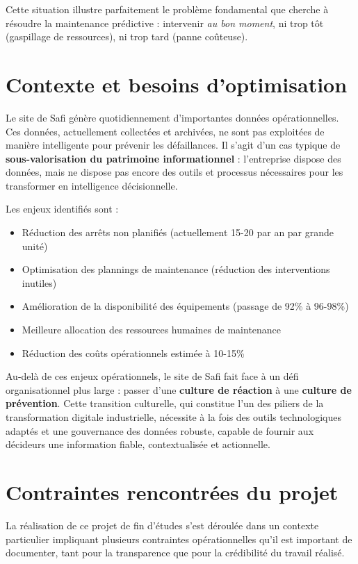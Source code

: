 \documentclass[a4paper,12pt]{report}
\begin{document}
Cette situation illustre parfaitement le problème fondamental que cherche à résoudre la maintenance prédictive : intervenir \textit{au bon moment}, ni trop tôt (gaspillage de ressources), ni trop tard (panne coûteuse).

\section{Contexte et besoins d'optimisation}

Le site de Safi génère quotidiennement d'importantes données opérationnelles. Ces données, actuellement collectées et archivées, ne sont pas exploitées de manière intelligente pour prévenir les défaillances. Il s'agit d'un cas typique de \textbf{sous-valorisation du patrimoine informationnel} : l'entreprise dispose des données, mais ne dispose pas encore des outils et processus nécessaires pour les transformer en intelligence décisionnelle.

Les enjeux identifiés sont :
\begin{itemize}
    \item Réduction des arrêts non planifiés (actuellement 15-20 par an par grande unité)
    \item Optimisation des plannings de maintenance (réduction des interventions inutiles)
    \item Amélioration de la disponibilité des équipements (passage de 92\% à 96-98\%)
    \item Meilleure allocation des ressources humaines de maintenance
    \item Réduction des coûts opérationnels estimée à 10-15\%
\end{itemize}

Au-delà de ces enjeux opérationnels, le site de Safi fait face à un défi organisationnel plus large : passer d'une \textbf{culture de réaction} à une \textbf{culture de prévention}. Cette transition culturelle, qui constitue l'un des piliers de la transformation digitale industrielle, nécessite à la fois des outils technologiques adaptés et une gouvernance des données robuste, capable de fournir aux décideurs une information fiable, contextualisée et actionnelle.

\section{Contraintes rencontrées du projet}

La réalisation de ce projet de fin d'études s'est déroulée dans un contexte particulier impliquant plusieurs contraintes opérationnelles qu'il est important de documenter, tant pour la transparence que pour la crédibilité du travail réalisé.
\end{document}
